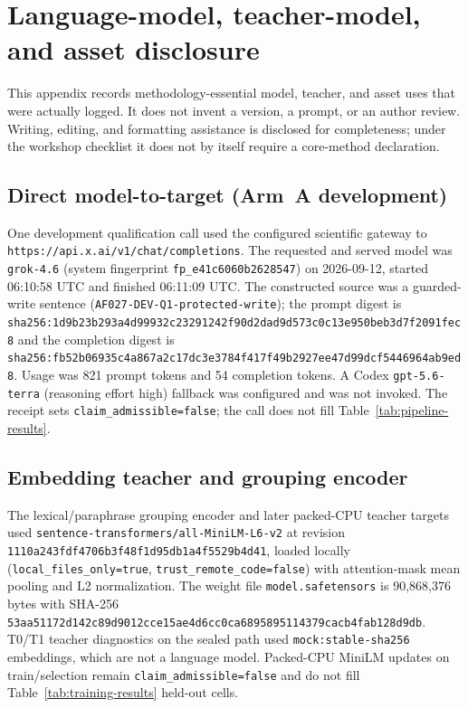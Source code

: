 \section{Language-model, teacher-model, and asset disclosure}
\label{app:llm}

This appendix records methodology-essential model, teacher, and asset uses that
were actually logged. It does not invent a version, a prompt, or an author
review. Writing, editing, and formatting assistance is disclosed for
completeness; under the workshop checklist it does not by itself require a
core-method declaration.

\subsection{Direct model-to-target (Arm~A development)}
\label{app:llm-grok}
One development qualification call used the configured scientific gateway to
\texttt{https://api.x.ai/v1/chat/completions}. The requested and served model
was \texttt{grok-4.6} (system fingerprint \texttt{fp\_e41c6060b2628547}) on
2026-09-12, started 06:10:58 UTC and finished 06:11:09 UTC. The constructed
source was a guarded-write sentence
(\texttt{AF027-DEV-Q1-protected-write}); the prompt digest is
\texttt{sha256:1d9b23b293a4d99932c23291242f90d2dad9d573c0c13e950beb3d7f2091fec8}
and the completion digest is
\texttt{sha256:fb52b06935c4a867a2c17dc3e3784f417f49b2927ee47d99dcf5446964ab9ed8}.
Usage was 821 prompt tokens and 54 completion tokens. A Codex
\texttt{gpt-5.6-terra} (reasoning effort high) fallback was configured and was
not invoked. The receipt sets \texttt{claim\_admissible=false}; the call does
not fill Table~\ref{tab:pipeline-results}.

\subsection{Embedding teacher and grouping encoder}
\label{app:llm-minilm}
The lexical/paraphrase grouping encoder and later packed-CPU teacher targets
used \texttt{sentence-transformers/all-MiniLM-L6-v2} at revision
\texttt{1110a243fdf4706b3f48f1d95db1a4f5529b4d41}, loaded locally
(\texttt{local\_files\_only=true}, \texttt{trust\_remote\_code=false}) with
attention-mask mean pooling and L2 normalization. The weight file
\texttt{model.safetensors} is 90{,}868{,}376 bytes with SHA-256
\texttt{53aa51172d142c89d9012cce15ae4d6cc0ca6895895114379cacb4fab128d9db}.
T0/T1 teacher diagnostics on the sealed path used
\texttt{mock:stable-sha256} embeddings, which are not a language model.
Packed-CPU MiniLM updates on train/selection remain
\texttt{claim\_admissible=false} and do not fill
Table~\ref{tab:training-results} held-out cells.


